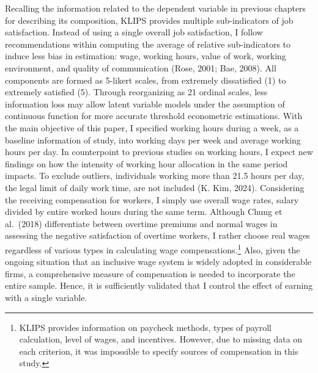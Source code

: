 \documentclass[
  12pt,
]{article}
\begin{document}
Recalling the information related to the dependent variable in previous
chapters for describing its composition, KLIPS provides multiple
sub-indicators of job satisfaction. Instead of using a single overall
job satisfaction, I follow recommendations within computing the average
of relative sub-indicators to induce less bias in estimation: wage,
working hours, value of work, working environment, and quality of
communication (Rose, 2001; Bae, 2008). All components are formed as
5-likert scales, from extremely dissatisfied (1) to extremely satisfied
(5). Through reorganizing as 21 ordinal scales, less information loss
may allow latent variable models under the assumption of continuous
function for more accurate threshold econometric estimations. With the
main objective of this paper, I specified working hours during a week,
as a baseline information of study, into working days per week and
average working hours per day. In counterpoint to previous studies on
working hours, I expect new findings on how the intensity of working
hour allocation in the same period impacts. To exclude outliers,
individuals working more than 21.5 hours per day, the legal limit of
daily work time, are not included (K. Kim, 2024). Considering the
receiving compensation for workers, I simply use overall wage rates,
salary divided by entire worked hours during the same term. Although
Chung et al.~(2018) differentiate between overtime premiums and normal
wages in assessing the negative satisfaction of overtime workers, I
rather choose real wages regardless of various types in calculating wage
compensations.\footnote{KLIPS provides information on paycheck methods,
  types of payroll calculation, level of wages, and incentives. However,
  due to missing data on each criterion, it was impossible to specify
  sources of compensation in this study.} Also, given the ongoing
situation that an inclusive wage system is widely adopted in
considerable firms, a comprehensive measure of compensation is needed to
incorporate the entire sample. Hence, it is sufficiently validated that
I control the effect of earning with a single variable.
\end{document}
